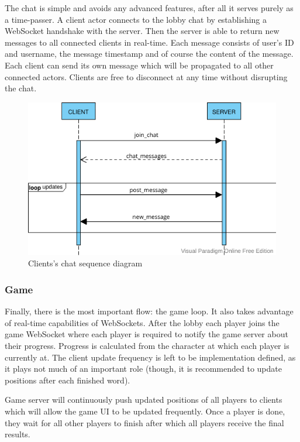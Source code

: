 \documentclass[titlepage]{article}
\begin{document}
The chat is simple and avoids any advanced features, after all it serves purely as a time-passer. A client actor connects to the lobby chat by establishing a WebSocket handshake with the server. Then the server is able to return new messages to all connected clients in real-time. Each message consists of user's ID and username, the message timestamp and of course the content of the message. Each client can send its own message which will be propagated to all other connected actors. Clients are free to disconnect at any time without disrupting the chat.

\begin{figure}[H]
	\centering
	\includegraphics[width=1\textwidth]{seq_diagram_chat.png}
	\caption{Clients's chat sequence diagram}
	\label{fig:seq-chat-leaderboard}
\end{figure}

\subsubsection{Game}

Finally, there is the most important flow: the game loop. It also takes advantage of real-time capabilities of WebSockets. After the lobby each player joins the game WebSocket where each player is required to notify the game server about their progress. Progress is calculated from the character at which each player is currently at. The client update frequency is left to be implementation defined, as it plays not much of an important role (though, it is recommended to update positions after each finished word).

Game server will continuously push updated positions of all players to clients which will allow the game UI to be updated frequently. Once a player is done, they wait for all other players to finish after which all players receive the final results.
\end{document}
